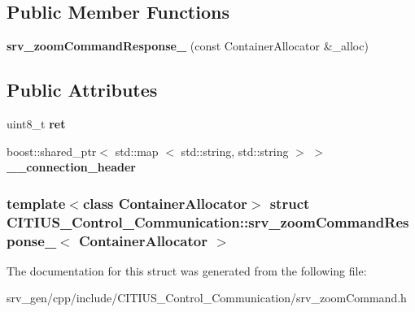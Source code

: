\subsection*{\-Public \-Member \-Functions}
\begin{DoxyCompactItemize}
\item 
\hypertarget{struct_c_i_t_i_u_s___control___communication_1_1srv__zoom_command_response___af40fa90cf589e7cb61930d22ad6804f1}{{\bfseries srv\-\_\-zoom\-Command\-Response\-\_\-} (const \-Container\-Allocator \&\-\_\-alloc)}\label{struct_c_i_t_i_u_s___control___communication_1_1srv__zoom_command_response___af40fa90cf589e7cb61930d22ad6804f1}

\end{DoxyCompactItemize}
\subsection*{\-Public \-Attributes}
\begin{DoxyCompactItemize}
\item 
\hypertarget{struct_c_i_t_i_u_s___control___communication_1_1srv__zoom_command_response___af7de68c9637b4cd5b64d2b8d3dceebfb}{uint8\-\_\-t {\bfseries ret}}\label{struct_c_i_t_i_u_s___control___communication_1_1srv__zoom_command_response___af7de68c9637b4cd5b64d2b8d3dceebfb}

\item 
\hypertarget{struct_c_i_t_i_u_s___control___communication_1_1srv__zoom_command_response___af7e46262a50d79a272c93af97cca3c45}{boost\-::shared\-\_\-ptr$<$ std\-::map\*
$<$ std\-::string, std\-::string $>$ $>$ {\bfseries \-\_\-\-\_\-connection\-\_\-header}}\label{struct_c_i_t_i_u_s___control___communication_1_1srv__zoom_command_response___af7e46262a50d79a272c93af97cca3c45}

\end{DoxyCompactItemize}
\subsubsection*{template$<$class Container\-Allocator$>$ struct C\-I\-T\-I\-U\-S\-\_\-\-Control\-\_\-\-Communication\-::srv\-\_\-zoom\-Command\-Response\-\_\-$<$ Container\-Allocator $>$}



\-The documentation for this struct was generated from the following file\-:\begin{DoxyCompactItemize}
\item 
srv\-\_\-gen/cpp/include/\-C\-I\-T\-I\-U\-S\-\_\-\-Control\-\_\-\-Communication/srv\-\_\-zoom\-Command.\-h\end{DoxyCompactItemize}
